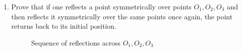 \documentclass{article}
\begin{document}
\begin{enumerate}[label=(\alph*)]
\begin{proof}
\begin{enumerate}[label=(\arabic*)]
\begin{align*}
            S_O((c,d))=(2g-c,2h-d)\\
            S_O((e,f))=(2g-e,2h-f).
        \end{align*}
        Next, 
        \begin{align*}
            T_{\overrightarrow{v}}((2g-a,2h-b))=(2h-a+v_1,2h-b+v_2)\\ T_{\overrightarrow{v}}((2g-c,2h-d))=(2h-c+v_1,2h-d+v_2)\\
            T_{\overrightarrow{v}}((2g-e,2h-f))=(2h-e+v_1,2h-f+v_2).
        \end{align*}
        Thus,
        \begin{align*}
            O'&=\left(\frac{(2g-a+v_1)+a}{2},\frac{(2h-b+v_2)+b}{2}\right )\\
            &=\left (\frac{(2g-c+v_1)+c}{2},\frac{(2h-d+v_2)+d}{2}\right )\\
            &=\left (\frac{(2g-e+v_1)+e}{2},\frac{(2h-f+v_2)+f}{2}\right )\\
            &=\left (\frac{2g+v_1}{2},\frac{2h+v_2}{2}\right )
        \end{align*} as desired.
    \end{enumerate}
    \end{proof}
    \item Prove that if one reflects a point symmetrically over points $O_1,O_2,O_3$ and then reflects it symmetrically over the same points once again, the point returns back to its initial position.

    \begin{figure}[ht]
        \centering
        
        \caption{Sequence of reflections across $O_1, O_2, O_3$}
    \end{figure}
    

\end{enumerate}
\end{document}

